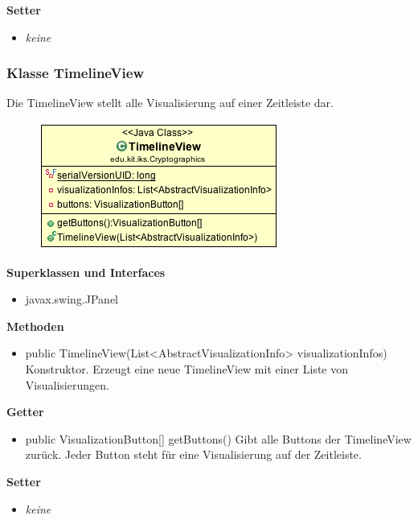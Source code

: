 \documentclass{article}
\begin{document}
      \textbf{Setter}
      \begin{itemize}
        \item \textit{keine}
      \end{itemize}

    \subsubsection{Klasse TimelineView}
      Die TimelineView stellt alle Visualisierung auf einer Zeitleiste dar.
      \begin{figure}[H]
        \centering
        \includegraphics{resources/edu-kit-iks-Cryptographics-TimelineView}
      \end{figure}

      \textbf{Superklassen und Interfaces}
      \begin{itemize}
        \item javax.swing.JPanel
      \end{itemize}
      
      \textbf{Methoden}
      \begin{itemize}
        \item public TimelineView(List<AbstractVisualizationInfo> visualizationInfos) \newline
        Konstruktor. Erzeugt eine neue TimelineView mit einer Liste von Visualisierungen.
      \end{itemize}

      \textbf{Getter}
      \begin{itemize}
        \item public VisualizationButton[] getButtons() \newline
        Gibt alle Buttons der TimelineView zurück. Jeder Button steht für eine Visualisierung auf der Zeitleiste.
      \end{itemize}

      \textbf{Setter}
      \begin{itemize}
        \item \textit{keine}
      \end{itemize}
\end{document}

